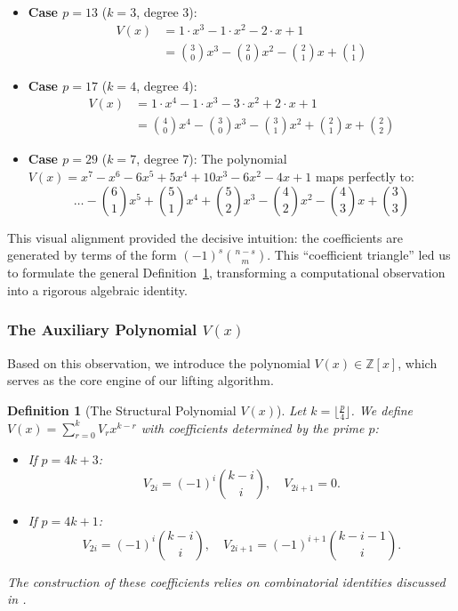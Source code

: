 \documentclass[12pt]{article}
\theoremstyle{plain}
\newtheorem{defn}{Definition}
\numberwithin{equation}{section}
\begin{document}
\begin{itemize}
    \item \textbf{Case $p=13$} ($k=3$, degree 3):
    $$
    \begin{aligned}
    V(x) &= 1 \cdot x^3 - 1 \cdot x^2 - 2 \cdot x + 1 \\
         &= \binom{3}{0} x^3 - \binom{2}{0} x^2 - \binom{2}{1} x + \binom{1}{1}
    \end{aligned}
    $$

    \item \textbf{Case $p=17$} ($k=4$, degree 4):
    $$
    \begin{aligned}
    V(x) &= 1 \cdot x^4 - 1 \cdot x^3 - 3 \cdot x^2 + 2 \cdot x + 1 \\
         &= \binom{4}{0} x^4 - \binom{3}{0} x^3 - \binom{3}{1} x^2 + \binom{2}{1} x + \binom{2}{2}
    \end{aligned}
    $$

    \item \textbf{Case $p=29$} ($k=7$, degree 7):
    The polynomial $V(x) = x^7 - x^6 - 6x^5 + 5x^4 + 10x^3 - 6x^2 - 4x + 1$ maps perfectly to:
    $$
    \dots - \binom{6}{1} x^5 + \binom{5}{1} x^4 + \binom{5}{2} x^3 - \binom{4}{2} x^2 - \binom{4}{3} x + \binom{3}{3}
    $$
\end{itemize}

This visual alignment provided the decisive intuition: the coefficients are generated by terms of the form $(-1)^s \binom{n-s}{m}$. This ``coefficient triangle'' led us to formulate the general Definition~\ref{def:Vx}, transforming a computational observation into a rigorous algebraic identity.
\subsubsection*{The Auxiliary Polynomial $V(x)$}

Based on this observation, we introduce the polynomial $V(x) \in \mathbb{Z}[x]$, which serves as the core engine of our lifting algorithm.

\begin{defn}[The Structural Polynomial $V(x)$]\label{def:Vx}
Let $k = \lfloor \frac{p}{4} \rfloor$. We define $V(x) = \sum_{r=0}^{k} V_r x^{k-r}$ with coefficients determined by the prime $p$:
\begin{itemize}
    \item If $p = 4k + 3$:
    $$V_{2i} = (-1)^i \binom{k-i}{i}, \quad V_{2i+1} = 0.$$
    \item If $p = 4k + 1$:
    $$V_{2i} = (-1)^i \binom{k-i}{i}, \quad V_{2i+1} = (-1)^{i+1} \binom{k-i-1}{i}.$$
\end{itemize}
The construction of these coefficients relies on combinatorial identities discussed in \cite{Shi2009}.
\end{defn}
\end{document}
